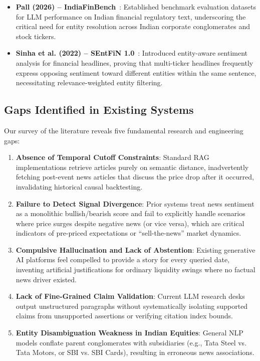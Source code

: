 \documentclass{article}
\begin{document}
\begin{itemize}
		\item \textbf{Pall (2026) -- IndiaFinBench}~\cite{pall2026indiafinbench}: Established benchmark evaluation datasets for LLM performance on Indian financial regulatory text, underscoring the critical need for entity resolution across Indian corporate conglomerates and stock tickers.
		\item \textbf{Sinha et al. (2022) -- SEntFiN 1.0}~\cite{sinha2022sentfin}: Introduced entity-aware sentiment analysis for financial headlines, proving that multi-ticker headlines frequently express opposing sentiment toward different entities within the same sentence, necessitating relevance-weighted entity filtering.
	\end{itemize}

	\subsection{Gaps Identified in Existing Systems}

	Our survey of the literature reveals five fundamental research and engineering gaps:
	\begin{enumerate}
		\item \textbf{Absence of Temporal Cutoff Constraints}: Standard RAG implementations retrieve articles purely on semantic distance, inadvertently fetching post-event news articles that discuss the price drop after it occurred, invalidating historical causal backtesting.
		\item \textbf{Failure to Detect Signal Divergence}: Prior systems treat news sentiment as a monolithic bullish/bearish score and fail to explicitly handle scenarios where price surges despite negative news (or vice versa), which are critical indicators of pre-priced expectations or ``sell-the-news'' market dynamics.
		\item \textbf{Compulsive Hallucination and Lack of Abstention}: Existing generative AI platforms feel compelled to provide a story for every queried date, inventing artificial justifications for ordinary liquidity swings where no factual news driver existed.
		\item \textbf{Lack of Fine-Grained Claim Validation}: Current LLM research desks output unstructured paragraphs without systematically isolating supported claims from unsupported assertions or verifying citation index bounds.
		\item \textbf{Entity Disambiguation Weakness in Indian Equities}: General NLP models conflate parent conglomerates with subsidiaries (e.g., Tata Steel vs. Tata Motors, or SBI vs. SBI Cards), resulting in erroneous news associations.
	\end{enumerate}
\end{document}
